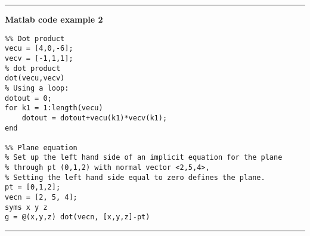 \documentclass[12pt,letterpaper,noanswers]{exam}
\begin{document}
\vspace{0.2cm}
\hrule
\vspace{0.2cm}
\noindent\textbf{Matlab code example 2}
\begin{lstlisting}
%% Dot product
vecu = [4,0,-6]; 
vecv = [-1,1,1];
% dot product
dot(vecu,vecv)
% Using a loop:
dotout = 0;
for k1 = 1:length(vecu)
    dotout = dotout+vecu(k1)*vecv(k1);
end

%% Plane equation
% Set up the left hand side of an implicit equation for the plane
% through pt (0,1,2) with normal vector <2,5,4>,
% Setting the left hand side equal to zero defines the plane.
pt = [0,1,2];
vecn = [2, 5, 4];
syms x y z
g = @(x,y,z) dot(vecn, [x,y,z]-pt)
\end{lstlisting}



\vspace{0.2cm}
\hrule
\vspace{0.2cm}
\end{document}
